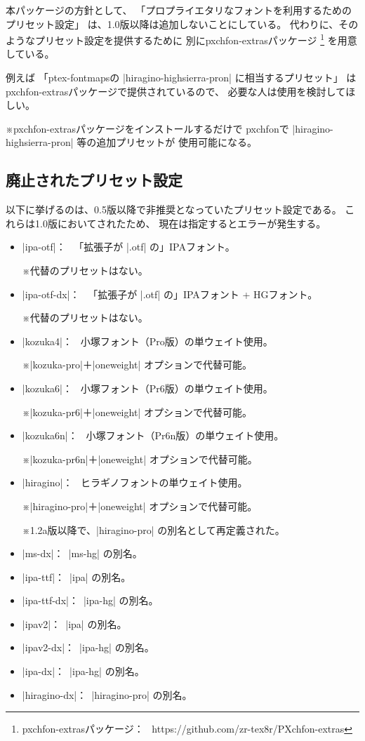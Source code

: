 \documentclass[uplatex,dvipdfmx,a4paper]{jsarticle}
\newcommand{\Pkg}[1]{\textsf{#1}}
\newcommand{\Note}{\par\noindent ※}
\newcommand{\Means}{：\ }
\providecommand{\Strong}[1]{\textsf{#1}}
\begin{document}
本パッケージの方針として、
「プロプライエタリなフォントを利用するためのプリセット設定」
は、1.0版以降は追加しないことにしている。
代わりに、そのようなプリセット設定を提供するために
別に\Strong{\Pkg{pxchfon-extras}パッケージ}%
\footnote{\Pkg{pxchfon-extras}パッケージ\Means
  https://github.com/zr-tex8r/PXchfon-extras}%
を用意している。

例えば
「\Pkg{ptex-fontmaps}の |hiragino-highsierra-pron|
に相当するプリセット」
は\Pkg{pxchfon-extras}パッケージで提供されているので、
必要な人は使用を検討してほしい。
\Note \Pkg{pxchfon-extras}パッケージをインストールするだけで
\Pkg{pxchfon}で |hiragino-highsierra-pron| 等の追加プリセットが
使用可能になる。

\subsection{廃止されたプリセット設定}

以下に挙げるのは、0.5版以降で非推奨となっていたプリセット設定である。
これらは1.0版においてされたため、
現在は指定するとエラーが発生する。

\begin{itemize}
\item |ipa-otf|\Means
  「拡張子が |.otf| の」IPAフォント。
  \Note 代替のプリセットはない。
\item |ipa-otf-dx|\Means
  「拡張子が |.otf| の」IPAフォント + HGフォント。
  \Note 代替のプリセットはない。
\item |kozuka4|\Means
  小塚フォント（Pro版）の単ウェイト使用。
  \Note |kozuka-pro|＋|oneweight| オプションで代替可能。
\item |kozuka6|\Means
  小塚フォント（Pr6版）の単ウェイト使用。
  \Note |kozuka-pr6|＋|oneweight| オプションで代替可能。
\item |kozuka6n|\Means
  小塚フォント（Pr6n版）の単ウェイト使用。
  \Note |kozuka-pr6n|＋|oneweight| オプションで代替可能。
\item |hiragino|\Means
  ヒラギノフォントの単ウェイト使用。
  \Note |hiragino-pro|＋|oneweight| オプションで代替可能。
  \Note 1.2a版以降で、|hiragino-pro| の別名として再定義された。
\item |ms-dx|\Means |ms-hg| の別名。
\item |ipa-ttf|\Means |ipa| の別名。
\item |ipa-ttf-dx|\Means |ipa-hg| の別名。
\item |ipav2|\Means |ipa| の別名。
\item |ipav2-dx|\Means |ipa-hg| の別名。
\item |ipa-dx|\Means |ipa-hg| の別名。
\item |hiragino-dx|\Means |hiragino-pro| の別名。
\end{itemize}
\end{document}
